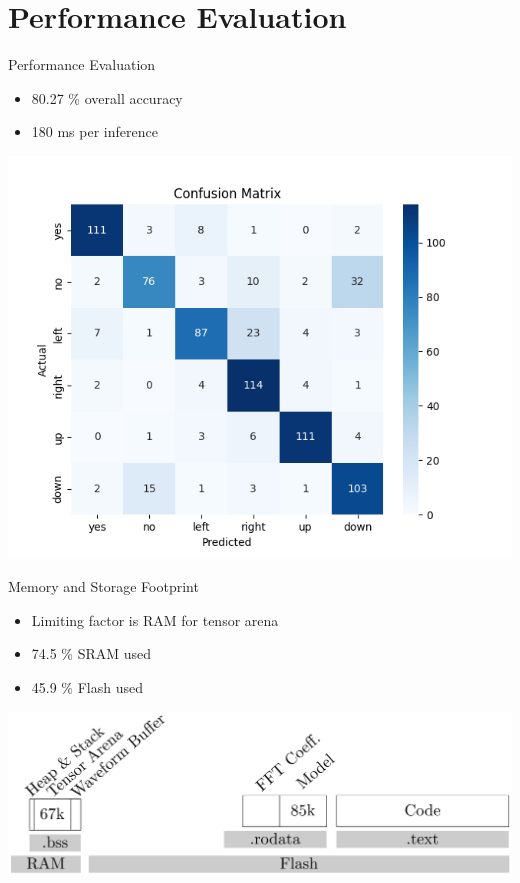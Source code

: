 \documentclass{beamer}
\begin{document}
\section{Performance Evaluation}
\begin{frame}{Performance Evaluation}
	\begin{minipage}{0.32\textwidth}
	\begin{itemize}
		\item<2->80.27 \% overall accuracy
		\item<3->180 ms per inference
	\end{itemize}

	\end{minipage}
	\begin{minipage}{0.65\textwidth}
		\includegraphics[width=\textwidth]{figures/confusion.png}
	\end{minipage}
\end{frame}

\begin{frame}{Memory and Storage Footprint}
	\begin{itemize}
		\item<2->Limiting factor is RAM for tensor arena
		\item<3->74.5 \% SRAM used
		\item<4->45.9 \% Flash used
	\end{itemize}
	\vspace{10mm}

	\includegraphics[width=\textwidth]{figures/memory_usage.png}
\end{frame}
\end{document}
